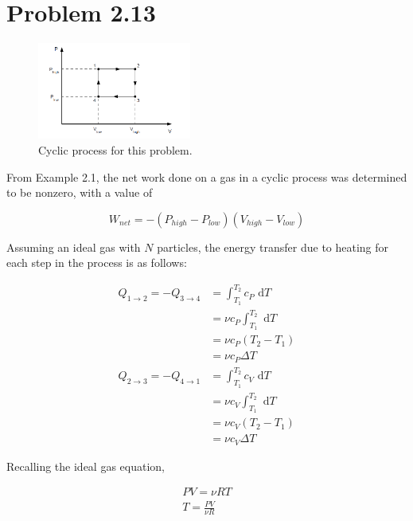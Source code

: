 \documentclass[12pt,a4paper,twocolumn]{article}
\begin{document}
\setcounter{page}{1}

\section*{Problem 2.13}
\bigskip

\begin{figure}[htb]
	\centering
	\includegraphics[width=0.45\textwidth]{work.png}
	\caption{Cyclic process for this problem.}
	\label{fig:cycle}
\end{figure}

From Example 2.1, the net work done on a gas in a cyclic process was determined to be nonzero, with a value of

\begin{equation}\label{oldanswer}
	W_{net} = -\left( P_{high} - P_{low} \right) \left( V_{high} - V_{low} \right)
\end{equation}

Assuming an ideal gas with $N$ particles, the energy transfer due to heating for each step in the process is as follows:

\begin{align}
	Q_{1 \rightarrow 2} = -Q_{3 \rightarrow 4} & = \int_{T_1}^{T_2} c_P \textrm{ d}T \\
	& = \nu c_P \int_{T_1}^{T_2} \textrm{ d}T \\
	& = \nu c_P \left( T_2 - T_1 \right) \\
	& = \nu c_P \Delta T \label{eq:isobaric} \\
	Q_{2 \rightarrow 3} = -Q_{4 \rightarrow 1} & = \int_{T_1}^{T_2} c_V \textrm{ d}T \\
	& = \nu c_V \int_{T_1}^{T_2} \textrm{ d}T \\
	& = \nu c_V \left( T_2 - T_1 \right) \\
	& = \nu c_V \Delta T \label{eq:isochoric}
\end{align}

Recalling the ideal gas equation,

\begin{eqnarray}
	PV = \nu RT \label{eq:idealgas} \\
	T = \frac{PV}{\nu R} \label{eq:idealtemp}
\end{eqnarray}
\end{document}
